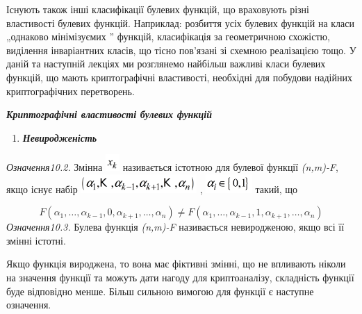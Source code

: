 Існують також інші класифікації булевих функцій, що враховують різні властивості
булевих функцій. Наприклад: розбиття усіх булевих функцій на класи „однаково
мінімізуємих ” функцій, класифікація за геометричною схожістю, виділення
інваріантних класів, що тісно пов’язані зі схемною реалізацією тощо. У даній та
наступній лекціях ми розглянемо найбільш важливі класи булевих функцій, що
мають криптографічні властивості, необхідні для побудови надійних
криптографічних перетворень.


\bigskip

{\centering\bfseries\itshape
Криптографічні властивості булевих функцій
\par}


\bigskip


\bigskip

\liststyleWWviiiNumxxix
\begin{enumerate}
\item {\bfseries\itshape
Невиродженість}
\end{enumerate}
 \textit{Означення10.2.}\textit{ }Змінна  
\includegraphics[width=0.2083in,height=0.25in]{crypt-img/crypt-img193.png} 
називається  істотною для булевої функції 
\textit{(}\textit{n}\textit{,}\textit{m}\textit{)-}\textit{F}, якщо існує набір
 \includegraphics[width=1.7362in,height=0.278in]{crypt-img/crypt-img194.png} , 
\includegraphics[width=0.6937in,height=0.278in]{crypt-img/crypt-img195.png} 
такий, що 

\begin{equation*}
{F(\alpha _{{1}},\dots,\alpha _{{k-1}},0,\alpha
_{{k+1}},\dots,\alpha _{{n}})\neq F(\alpha
_{{1}},\dots,\alpha _{{k-1}},1,\alpha
_{{k+1}},\dots,\alpha _{{n}})}
\end{equation*}
 \textit{Означення10.3.}\textit{ }Булева функція
\textit{(}\textit{n}\textit{,}\textit{m}\textit{)-}\textit{F}  називається
невиродженою, якщо всі її змінні істотні.

Якщо функція вироджена, то вона має фіктивні змінні, що не впливають ніколи на
значення функції та можуть дати нагоду для криптоаналізу, складність функції
буде відповідно менше. Більш сильною вимогою для функції є наступне означення.

